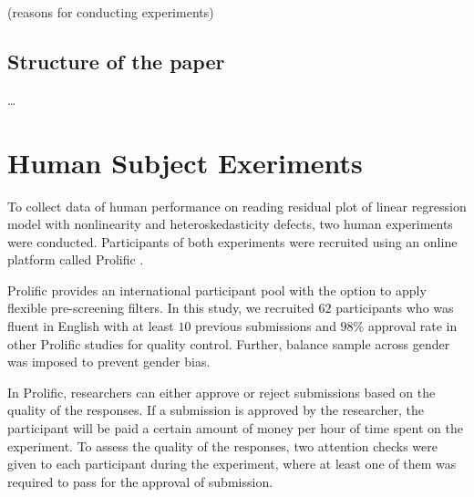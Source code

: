 \documentclass{monashthesis}
\theoremstyle{definition}
\theoremstyle{definition}
\theoremstyle{definition}
\theoremstyle{definition}
\theoremstyle{remark}
\begin{document}
(reasons for conducting experiments)

\hypertarget{structure-of-the-paper}{%
\section{Structure of the paper}\label{structure-of-the-paper}}

\ldots{}

\hypertarget{human-subject-exeriments}{%
\chapter{Human Subject Exeriments}\label{human-subject-exeriments}}

To collect data of human performance on reading residual plot of linear regression model with nonlinearity and heteroskedasticity defects, two human experiments were conducted. Participants of both experiments were recruited using an online platform called Prolific \autocite{prolific_prolific_2022}.

Prolific provides an international participant pool with the option to apply flexible pre-screening filters. In this study, we recruited \(62\) participants who was fluent in English with at least \(10\) previous submissions and \(98\)\% approval rate in other Prolific studies for quality control. Further, balance sample across gender was imposed to prevent gender bias.

In Prolific, researchers can either approve or reject submissions based on the quality of the responses. If a submission is approved by the researcher, the participant will be paid a certain amount of money per hour of time spent on the experiment. To assess the quality of the responses, two attention checks were given to each participant during the experiment, where at least one of them was required to pass for the approval of submission.
\end{document}

